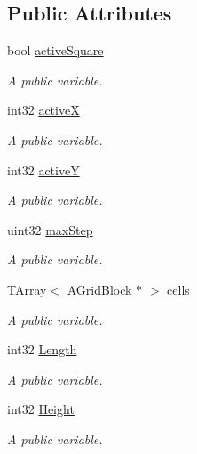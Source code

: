 \subsection*{Public Attributes}
\begin{DoxyCompactItemize}
\item 
bool \hyperlink{class_a_unreal_grid_a3c7f942498aac5d56e594f4c71be239b}{active\+Square}
\begin{DoxyCompactList}\small\item\em A public variable. \end{DoxyCompactList}\item 
int32 \hyperlink{class_a_unreal_grid_ab968c97a7b73c4c4a78752810340db86}{activeX}
\begin{DoxyCompactList}\small\item\em A public variable. \end{DoxyCompactList}\item 
int32 \hyperlink{class_a_unreal_grid_a112aaee76dadd64d889a14d1fc25cb2a}{activeY}
\begin{DoxyCompactList}\small\item\em A public variable. \end{DoxyCompactList}\item 
uint32 \hyperlink{class_a_unreal_grid_a17290d30345faf244ad5fabde26046ac}{max\+Step}
\begin{DoxyCompactList}\small\item\em A public variable. \end{DoxyCompactList}\item 
T\+Array$<$ \hyperlink{class_a_grid_block}{A\+Grid\+Block} $\ast$ $>$ \hyperlink{class_a_unreal_grid_a190e16b669bb5cb44c29765ba772c3f5}{cells}
\begin{DoxyCompactList}\small\item\em A public variable. \end{DoxyCompactList}\item 
int32 \hyperlink{class_a_unreal_grid_aff61595921013715b51b18bbd5d624ea}{Length}
\begin{DoxyCompactList}\small\item\em A public variable. \end{DoxyCompactList}\item 
int32 \hyperlink{class_a_unreal_grid_a7674836c06f6c4022f98bdecd72cb89c}{Height}
\begin{DoxyCompactList}\small\item\em A public variable. \end{DoxyCompactList}\item 

\end{DoxyCompactItemize}

